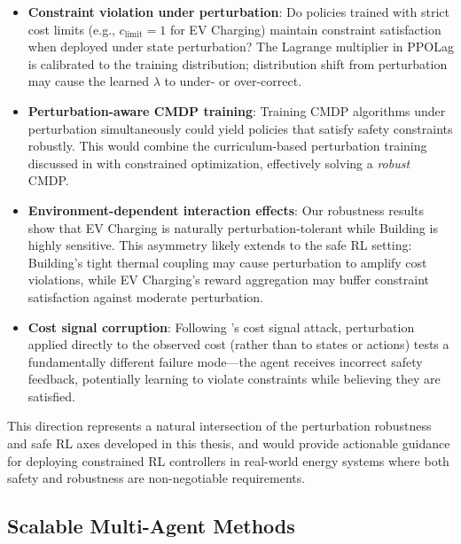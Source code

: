 \begin{itemize}
    \item \textbf{Constraint violation under perturbation}: Do policies trained with strict cost limits (e.g., $c_{\text{limit}} = 1$ for EV Charging) maintain constraint satisfaction when deployed under state perturbation? The Lagrange multiplier in PPOLag is calibrated to the training distribution; distribution shift from perturbation may cause the learned $\lambda$ to under- or over-correct.

    \item \textbf{Perturbation-aware CMDP training}: Training CMDP algorithms under perturbation simultaneously could yield policies that satisfy safety constraints robustly. This would combine the curriculum-based perturbation training discussed in  with constrained optimization, effectively solving a \emph{robust} CMDP.

    \item \textbf{Environment-dependent interaction effects}: Our robustness results show that EV Charging is naturally perturbation-tolerant while Building is highly sensitive. This asymmetry likely extends to the safe RL setting: Building's tight thermal coupling may cause perturbation to amplify cost violations, while EV Charging's reward aggregation may buffer constraint satisfaction against moderate perturbation.

    \item \textbf{Cost signal corruption}: Following \citet{gu2025robustgymnasium}'s cost signal attack, perturbation applied directly to the observed cost (rather than to states or actions) tests a fundamentally different failure mode---the agent receives incorrect safety feedback, potentially learning to violate constraints while believing they are satisfied.
\end{itemize}

This direction represents a natural intersection of the perturbation robustness and safe RL axes developed in this thesis, and would provide actionable guidance for deploying constrained RL controllers in real-world energy systems where both safety and robustness are non-negotiable requirements.

\subsection{Scalable Multi-Agent Methods}

